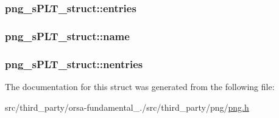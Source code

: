 \subsubsection[{entries}]{ png\+\_\+s\+P\+L\+T\+\_\+struct\+::entries}\label{structpng__sPLT__struct_a4c7db13fb1a7f0ede434e174b20151ec}
\hypertarget{structpng__sPLT__struct_af3b088b149e790b9b98ebedde69a70f0}{}
\subsubsection[{name}]{ png\+\_\+s\+P\+L\+T\+\_\+struct\+::name}\label{structpng__sPLT__struct_af3b088b149e790b9b98ebedde69a70f0}
\hypertarget{structpng__sPLT__struct_ac5844e98e4c43733bad6b83b54dc7a9f}{}
\subsubsection[{nentries}]{ png\+\_\+s\+P\+L\+T\+\_\+struct\+::nentries}\label{structpng__sPLT__struct_ac5844e98e4c43733bad6b83b54dc7a9f}


The documentation for this struct was generated from the following file\+:\begin{DoxyCompactItemize}
\item 
src/third\+\_\+party/orsa-\/fundamental\+\_./src/third\+\_\+party/png/\hyperlink{png_8h}{png.\+h}\end{DoxyCompactItemize}
